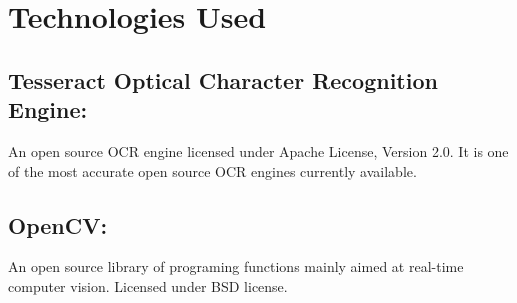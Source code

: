 \chapter{Technologies Used}



\section{Tesseract Optical Character Recognition Engine:}
An open source OCR engine licensed under Apache License, Version 2.0\footnotemark. It is one of the most accurate open source OCR engines currently available.




\section{OpenCV:}
An open source library of programing functions mainly aimed at real-time computer vision. Licensed under BSD license\footnotemark.







